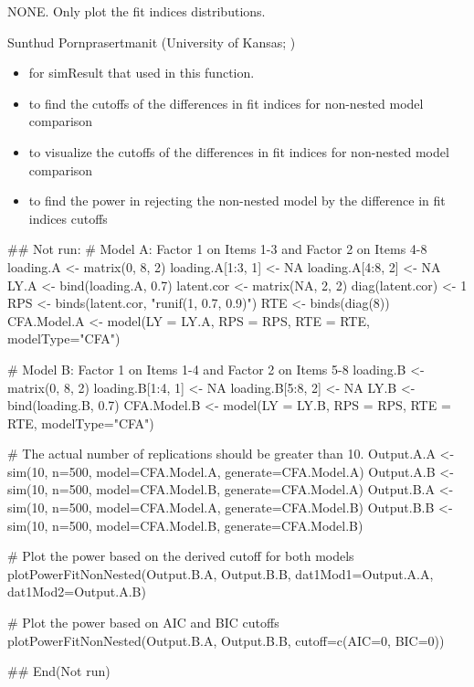 \documentclass[a4paper]{book}
\begin{document}
%
\begin{Value}
NONE. Only plot the fit indices distributions.
\end{Value}
%
\begin{Author}\relax
Sunthud Pornprasertmanit (University of Kansas; )
\end{Author}
%
\begin{SeeAlso}\relax
\begin{itemize}

\item {} for simResult that used in this function.
\item {} to find the cutoffs of the differences in fit indices for non-nested model comparison
\item {} to visualize the cutoffs of the differences in fit indices for non-nested model comparison
\item {} to find the power in rejecting the non-nested model by the difference in fit indices cutoffs

\end{itemize}

\end{SeeAlso}
%
\begin{Examples}
\begin{ExampleCode}
## Not run: 
# Model A: Factor 1 on Items 1-3 and Factor 2 on Items 4-8
loading.A <- matrix(0, 8, 2)
loading.A[1:3, 1] <- NA
loading.A[4:8, 2] <- NA
LY.A <- bind(loading.A, 0.7)
latent.cor <- matrix(NA, 2, 2)
diag(latent.cor) <- 1
RPS <- binds(latent.cor, "runif(1, 0.7, 0.9)")
RTE <- binds(diag(8))
CFA.Model.A <- model(LY = LY.A, RPS = RPS, RTE = RTE, modelType="CFA")

# Model B: Factor 1 on Items 1-4 and Factor 2 on Items 5-8
loading.B <- matrix(0, 8, 2)
loading.B[1:4, 1] <- NA
loading.B[5:8, 2] <- NA
LY.B <- bind(loading.B, 0.7)
CFA.Model.B <- model(LY = LY.B, RPS = RPS, RTE = RTE, modelType="CFA")

# The actual number of replications should be greater than 10.
Output.A.A <- sim(10, n=500, model=CFA.Model.A, generate=CFA.Model.A)
Output.A.B <- sim(10, n=500, model=CFA.Model.B, generate=CFA.Model.A)
Output.B.A <- sim(10, n=500, model=CFA.Model.A, generate=CFA.Model.B)
Output.B.B <- sim(10, n=500, model=CFA.Model.B, generate=CFA.Model.B)

# Plot the power based on the derived cutoff for both models
plotPowerFitNonNested(Output.B.A, Output.B.B, dat1Mod1=Output.A.A, dat1Mod2=Output.A.B)

# Plot the power based on AIC and BIC cutoffs
plotPowerFitNonNested(Output.B.A, Output.B.B, cutoff=c(AIC=0, BIC=0))

## End(Not run)
\end{ExampleCode}
\end{Examples}
\end{document}
